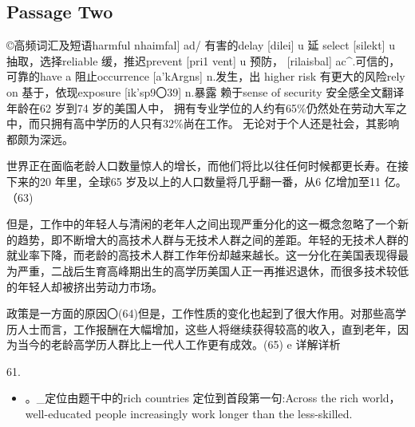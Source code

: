 \documentclass[UTF8,11pt]{ctexart}
\begin{document}
\subsection*{Passage Two}


©高频词汇及短语harmful nhaimfal] ad/ 有害的delay [dilei] u 延 select [silekt] u 抽取，选择reliable 缓，推迟prevent [pri1 vent] u 预防， [rilaisbal] ac\textasciicircum{}.可信的，可靠的have a 阻止occurrence [a'kArgns] n.发生，出 higher risk 有更大的风险rely on 基于，依现exposure [ik'sp9〇39] n.暴露 赖于sense of security 安全感全文翻译年龄在62 岁到74 岁的美国人中， 拥有专业学位的人约有65\%仍然处在劳动大军之中，而只拥有高中学历的人只有32\%尚在工作。 无论对于个人还是社会，其影响都颇为深远。


世界正在面临老龄人口数量惊人的增长，而他们将比以往任何时候都更长寿。在接下来的20 年里，全球65 岁及以上的人口数量将几乎翻一番，从6 亿增加至11 亿。（63) 


但是，工作中的年轻人与清闲的老年人之间出现严重分化的这一概念忽略了一个新的趋势，即不断增大的高技术人群与无技术人群之间的差距。年轻的无技术人群的就业率下降，而老龄的高技术人群工作年份却越来越长。这一分化在美国表现得最为严重，二战后生育高峰期出生的高学历美国人正一再推迟退休，而很多技术较低的年轻人却被挤出劳动力市场。


政策是一方面的原因〇(64)但是，工作性质的变化也起到了很大作用。对那些高学历人士而言，工作报酬在大幅增加，这些人将继续获得较高的收入，直到老年，因为当今的老龄高学历人群比上一代人工作更有成效。(65) e 详解详析


61.


\begin{itemize}[leftmargin=2em,itemsep=.2em,topsep=.4em]\item[B.] 。\_定位由题干中的rich countries 定位到首段第一句:Across the rich world，well-educated people increasingly work longer than the less-skilled.
\end{itemize}
\end{document}
